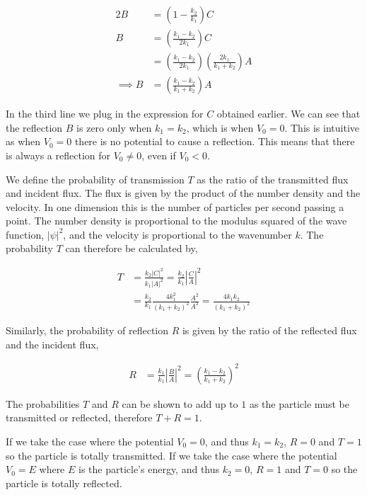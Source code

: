 \documentclass[11pt]{amsart}
\begin{document}
\begin{align*}
  2B &= \left(1 - \frac{k_2}{k_1}\right) C \\
  B  &= \left(\frac{k_1 - k_2}{2k_1}\right) C \\
     &= \left(\frac{k_1 - k_2}{2k_1}\right) \left(\frac{2k_1}{k_1 + k_2}\right) A \\
  \implies B &= \left(\frac{k_1 - k_2}{k_1 + k_2}\right) A
\end{align*}

In the third line we plug in the expression for $C$ obtained earlier. We can see that the reflection $B$ is zero only when $k_1 = k_2$, which is when $V_0 = 0$. This is intuitive as when $V_0 = 0$ there is no potential to cause a reflection. This means that there is always a reflection for $V_0 \neq 0$, even if $V_0 < 0$.

We define the probability of transmission $T$ as the ratio of the transmitted flux and incident flux. The flux is given by the product of the number density and the velocity. In one dimension this is the number of particles per second passing a point. The number density is proportional to the modulus squared of the wave function, ${|\psi|}^2$, and the velocity is proportional to the wavenumber $k$. The probability $T$ can therefore be calculated by,

\begin{align*}
  T &= \frac{k_2 {|C|}^2}{k_1 {|A|}^2} = \frac{k_2}{k_1} {\left|\frac{C}{A}\right|}^2 \\
    &= \frac{k_2}{k_1} \frac{4k_1^2}{{\left(k_1 + k_2\right)}^2} \frac{A^2}{A^2} = \frac{4 k_1 k_2}{{\left(k_1 + k_2\right)}^2}
\end{align*}

Similarly, the probability of reflection $R$ is given by the ratio of the reflected flux and the incident flux,

\begin{align*}
  R &= \frac{k_1}{k_1} {\left|\frac{B}{A}\right|}^2 = {\left(\frac{k_1 - k_2}{k_1 + k_2}\right)}^2
\end{align*}

The probabilities $T$ and $R$ can be shown to add up to $1$ as the particle must be transmitted or reflected, therefore $T + R = 1$.

If we take the case where the potential $V_0 = 0$, and thus $k_1 = k_2$, $R = 0$ and $T = 1$ so the particle is totally transmitted. If we take the case where the potential $V_0 = E$ where $E$ is the particle's energy, and thus $k_2 = 0$, $R = 1$ and $T = 0$ so the particle is totally reflected.
\end{document}
